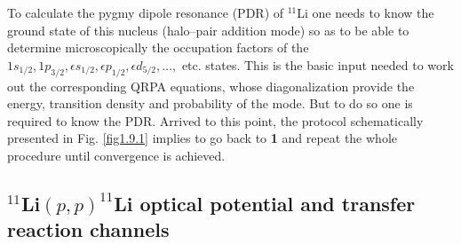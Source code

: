  To calculate the pygmy dipole  resonance (PDR) of $^{11}$Li one needs to know the ground state of this nucleus (halo--pair addition mode) so as to be able to determine microscopically the occupation factors of the $1s_{1/2},1p_{3/2},\epsilon s_{1/2},\epsilon p_{1/2},\epsilon d_{5/2},\dots,$ etc. states.  This is the basic input needed to work out the corresponding QRPA equations, whose diagonalization provide the energy, transition density and probability of the mode. But to do so one is required to know the PDR. Arrived to this point, the protocol schematically presented in Fig. \ref{fig1.9.1}  implies to  go back to \textbf{1} and repeat the whole procedure until   convergence is achieved. 

\subsection{$^{11}$Li$(p,p)^{11}$Li optical potential and transfer reaction channels}
